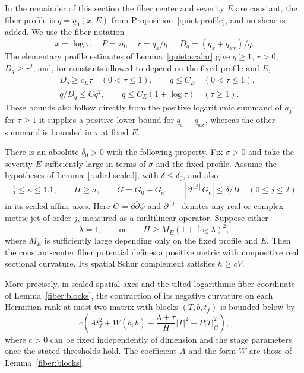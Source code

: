 In the remainder of this section the fiber center and severity $E$ are constant, the fiber profile is $q=q_0(x,E)$ from Proposition~\ref{quiet:profile}, and no shear is added. We use the fiber notation
\[
 x=\log\tau,\quad P=\tau q,\quad r=q_x/q,\quad
 D_q=(q_x+q_{xx})/q.
\]
The elementary profile estimates of Lemma~\ref{quiet:scalar} give $q\ge1$, $r>0$, $D_q\ge r^2$, and, for constants allowed to depend on the fixed profile and $E$,
\begin{equation}\label{radial:profile-bounds}
 \begin{split}
 &D_q\ge c_E\tau\quad(0<\tau\le1),\qquad q\le C_E\quad(0<\tau\le1),\\
 &q/D_q\le C q^2,\qquad q\le C_E(1+\log\tau)\quad(\tau\ge1).
 \end{split}
\end{equation}
These bounds also follow directly from the positive logarithmic summand of $q_0$: for $\tau\ge1$ it supplies a positive lower bound for $q_x+q_{xx}$, whereas the other summand is bounded in $\tau$ at fixed $E$.

\begin{proposition}\label{radial:aligned}
There is an absolute $\delta_0>0$ with the following property. Fix $\sigma>0$ and take the severity $E$ sufficiently large in terms of $\sigma$ and the fixed profile. Assume the hypotheses of Lemma~\ref{radial:scaled}, with $\delta\le\delta_0$, and also
\[
 \tfrac12\le\kappa\le1.1,\qquad H\ge\sigma,
 \qquad G=G_0+G_e,\qquad
 |\partial^{[j]}G_e|\le\delta/H\quad(0\le j\le2)
\]
in its scaled affine axes. Here $G=\partial\bar\partial\psi$ and $\partial^{[j]}$ denotes any real or complex metric jet of order $j$, measured as a multilinear operator. Suppose either
\begin{equation}\label{radial:aligned-alternatives}
 \lambda=1,\qquad\text{or}\qquad
 H\ge M_E(1+\log\lambda)^2,
\end{equation}
where $M_E$ is sufficiently large depending only on the fixed profile and $E$. Then the constant-center fiber potential defines a positive metric with nonpositive real sectional curvature. Its spatial Schur complement satisfies $h\ge cV$.

More precisely, in scaled spatial axes and the tilted logarithmic fiber coordinate of Lemma~\ref{fiber:blocks}, the contraction of its negative curvature on each Hermitian rank-at-most-two matrix with blocks $(T,b,t_f)$ is bounded below by
\begin{equation}\label{radial:aligned-margin}
 c\left(A t_f^2+W(b,\bar b)
               +\frac{\lambda+\tau}{H}|T|^2
               +P|T|_G^2\right),
\end{equation}
where $c>0$ can be fixed independently of dimension and the stage parameters once the stated thresholds hold. The coefficient $A$ and the form $W$ are those of Lemma~\ref{fiber:blocks}.
\end{proposition}

